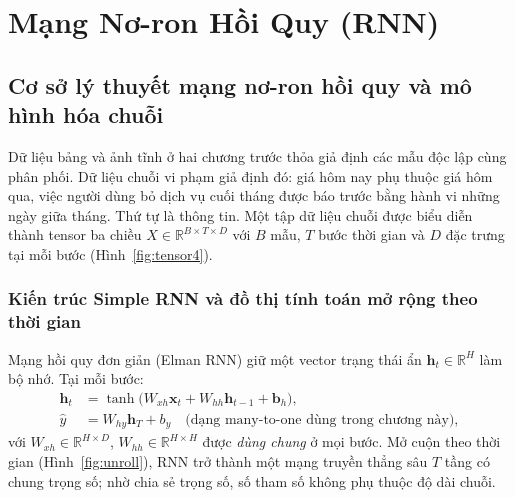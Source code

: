 \chapter{Mạng Nơ-ron Hồi Quy (RNN)}
\label{ch:rnn}

\section{Cơ sở lý thuyết mạng nơ-ron hồi quy và mô hình hóa chuỗi}

Dữ liệu bảng và ảnh tĩnh ở hai chương trước thỏa giả định các mẫu độc lập cùng phân phối. Dữ liệu chuỗi vi phạm giả định
đó: giá hôm nay phụ thuộc giá hôm qua, việc người dùng bỏ dịch vụ cuối tháng được báo trước bằng hành vi những ngày giữa
tháng. Thứ tự là thông tin. Một tập dữ liệu chuỗi được biểu diễn thành tensor ba chiều $X \in \mathbb{R}^{B\times T\times D}$
với $B$ mẫu, $T$ bước thời gian và $D$ đặc trưng tại mỗi bước (Hình~\ref{fig:tensor4}).


\subsection{Kiến trúc Simple RNN và đồ thị tính toán mở rộng theo thời gian}

Mạng hồi quy đơn giản (Elman RNN) giữ một vector trạng thái ẩn $\mathbf{h}_t \in \mathbb{R}^H$ làm bộ nhớ. Tại mỗi bước:
\begin{align}
  \mathbf{h}_t &= \tanh\big(W_{xh}\mathbf{x}_t + W_{hh}\mathbf{h}_{t-1} + \mathbf{b}_h\big), \label{eq:rnn}\\
  \hat y &= W_{hy}\mathbf{h}_T + b_y \quad \text{(dạng many-to-one dùng trong chương này)},
\end{align}
với $W_{xh} \in \mathbb{R}^{H\times D}$, $W_{hh} \in \mathbb{R}^{H\times H}$ được \emph{dùng chung} ở mọi bước. Mở cuộn theo
thời gian (Hình~\ref{fig:unroll}), RNN trở thành một mạng truyền thẳng sâu $T$ tầng có chung trọng số; nhờ chia sẻ trọng số,
số tham số không phụ thuộc độ dài chuỗi.


